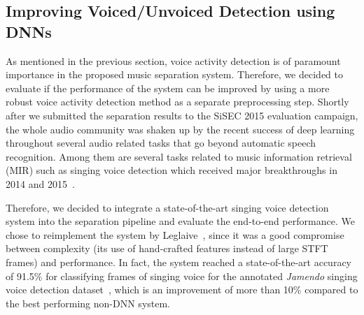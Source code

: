 \subsection{Improving Voiced/Unvoiced Detection using DNNs}

As mentioned in the previous section, voice activity detection is of paramount importance in the proposed music separation system.
Therefore, we decided to evaluate if the performance of the system can be improved by using a more robust voice activity detection method as a separate preprocessing step.
Shortly after we submitted the separation results to the SiSEC 2015 evaluation campaign, the whole audio community was shaken up by the recent success of deep learning throughout several audio related tasks that go beyond automatic speech recognition.
Among them are several tasks related to music information retrieval (MIR) such as singing voice detection which received major breakthroughs in 2014 and 2015~\cite{lehner14, lehner15, Leglaive15, schlueter15}.
\par
Therefore, we decided to integrate a state-of-the-art singing voice detection system into the separation pipeline and evaluate the end-to-end performance.
We chose to reimplement the system by Leglaive~\cite{Leglaive15}, since it was a good compromise between complexity (its use of hand-crafted features instead of large STFT frames) and performance.
In fact, the system reached a state-of-the-art accuracy of 91.5\% for classifying frames of singing voice for the annotated \emph{Jamendo} singing voice detection dataset~\cite{ramona08}, which is an improvement of more than 10\% compared to the best performing non-DNN system.
